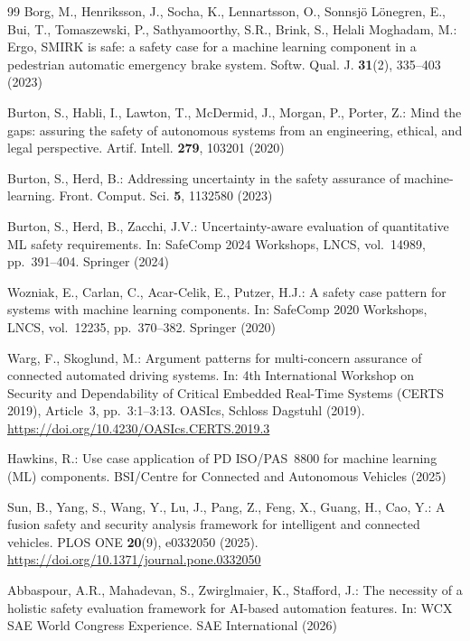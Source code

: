 \documentclass[runningheads]{llncs}
\newcommand{\crev}[1]{\textcolor{blue!75!black}{#1}}
\newcommand{\crev}[1]{#1}
\begin{document}
\begin{thebibliography}{99}
		Borg, M., Henriksson, J., Socha, K., Lennartsson, O., Sonnsj\"o L\"onegren, E., Bui, T., Tomaszewski, P., Sathyamoorthy, S.R., Brink, S., Helali Moghadam, M.: Ergo, SMIRK is safe: a safety case for a machine learning component in a pedestrian automatic emergency brake system. Softw. Qual. J. \textbf{31}(2), 335--403 (2023)
		
		Burton, S., Habli, I., Lawton, T., McDermid, J., Morgan, P., Porter, Z.: Mind the gaps: assuring the safety of autonomous systems from an engineering, ethical, and legal perspective. Artif. Intell. \textbf{279}, 103201 (2020)
		
		Burton, S., Herd, B.: Addressing uncertainty in the safety assurance of machine-learning. Front. Comput. Sci. \textbf{5}, 1132580 (2023)
		
		Burton, S., Herd, B., Zacchi, J.V.: Uncertainty-aware evaluation of quantitative ML safety requirements. In: SafeComp 2024 Workshops, LNCS, vol.~14989, pp.~391--404. Springer (2024)
		
		Wozniak, E., Carlan, C., Acar-Celik, E., Putzer, H.J.: A safety case pattern for systems with machine learning components. In: SafeComp 2020 Workshops, LNCS, vol.~12235, pp.~370--382. Springer (2020)
		
		Warg, F., Skoglund, M.: Argument patterns for multi-concern assurance of connected automated driving systems. In: 4th International Workshop on Security and Dependability of Critical Embedded Real-Time Systems (CERTS 2019), Article~3, pp.~3:1--3:13. OASIcs, Schloss Dagstuhl (2019). \url{https://doi.org/10.4230/OASIcs.CERTS.2019.3}
		
		Hawkins, R.: Use case application of PD ISO/PAS~8800 for machine learning (ML) components. BSI/Centre for Connected and Autonomous Vehicles (2025)
		
	\crev{Sun, B., Yang, S., Wang, Y., Lu, J., Pang, Z., Feng, X., Guang, H., Cao, Y.: A fusion safety and security analysis framework for intelligent and connected vehicles. PLOS ONE \textbf{20}(9), e0332050 (2025). \url{https://doi.org/10.1371/journal.pone.0332050}}
		
		\crev{Abbaspour, A.R., Mahadevan, S., Zwirglmaier, K., Stafford, J.: The necessity of a holistic safety evaluation framework for AI-based automation features. In: WCX SAE World Congress Experience. SAE International (2026)}
		

\end{thebibliography}
\end{document}
